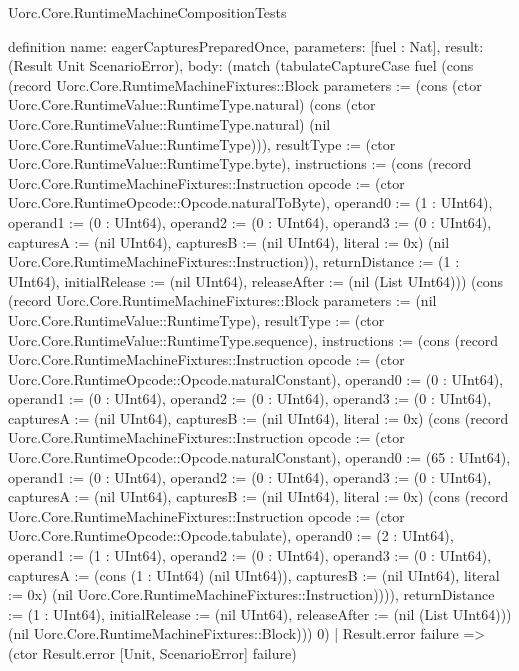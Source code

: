 \begin{lexlean}{Uorc.Core.RuntimeMachineCompositionTests}
\begin{semanticmodule}
definition{
  name: eagerCapturesPreparedOnce,
  parameters: [fuel : Nat],
  result: (Result Unit ScenarioError),
  body: (match (tabulateCaptureCase fuel (cons (record Uorc.Core.RuntimeMachineFixtures::Block {parameters := (cons (ctor Uorc.Core.RuntimeValue::RuntimeType.natural) (cons (ctor Uorc.Core.RuntimeValue::RuntimeType.natural) (nil Uorc.Core.RuntimeValue::RuntimeType))), resultType := (ctor Uorc.Core.RuntimeValue::RuntimeType.byte), instructions := (cons (record Uorc.Core.RuntimeMachineFixtures::Instruction {opcode := (ctor Uorc.Core.RuntimeOpcode::Opcode.naturalToByte), operand0 := (1 : UInt64), operand1 := (0 : UInt64), operand2 := (0 : UInt64), operand3 := (0 : UInt64), capturesA := (nil UInt64), capturesB := (nil UInt64), literal := 0x}) (nil Uorc.Core.RuntimeMachineFixtures::Instruction)), returnDistance := (1 : UInt64), initialRelease := (nil UInt64), releaseAfter := (nil (List UInt64))}) (cons (record Uorc.Core.RuntimeMachineFixtures::Block {parameters := (nil Uorc.Core.RuntimeValue::RuntimeType), resultType := (ctor Uorc.Core.RuntimeValue::RuntimeType.sequence), instructions := (cons (record Uorc.Core.RuntimeMachineFixtures::Instruction {opcode := (ctor Uorc.Core.RuntimeOpcode::Opcode.naturalConstant), operand0 := (0 : UInt64), operand1 := (0 : UInt64), operand2 := (0 : UInt64), operand3 := (0 : UInt64), capturesA := (nil UInt64), capturesB := (nil UInt64), literal := 0x}) (cons (record Uorc.Core.RuntimeMachineFixtures::Instruction {opcode := (ctor Uorc.Core.RuntimeOpcode::Opcode.naturalConstant), operand0 := (65 : UInt64), operand1 := (0 : UInt64), operand2 := (0 : UInt64), operand3 := (0 : UInt64), capturesA := (nil UInt64), capturesB := (nil UInt64), literal := 0x}) (cons (record Uorc.Core.RuntimeMachineFixtures::Instruction {opcode := (ctor Uorc.Core.RuntimeOpcode::Opcode.tabulate), operand0 := (2 : UInt64), operand1 := (1 : UInt64), operand2 := (0 : UInt64), operand3 := (0 : UInt64), capturesA := (cons (1 : UInt64) (nil UInt64)), capturesB := (nil UInt64), literal := 0x}) (nil Uorc.Core.RuntimeMachineFixtures::Instruction)))), returnDistance := (1 : UInt64), initialRelease := (nil UInt64), releaseAfter := (nil (List UInt64))}) (nil Uorc.Core.RuntimeMachineFixtures::Block))) 0)
    | Result.error failure => (ctor Result.error [Unit, ScenarioError] failure)
}
\end{semanticmodule}
\end{lexlean}

